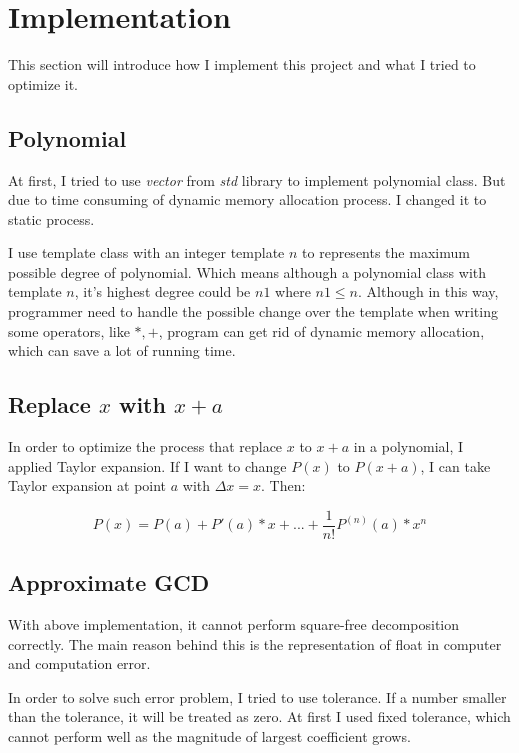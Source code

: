 \section{Implementation}

This section will introduce how I implement this project and what I tried to
optimize it.

\subsection{Polynomial} 

At first, I tried to use \textit{vector} from \textit{std} library to implement
polynomial class. But due to time consuming of dynamic memory allocation
process. I changed it to static process.  

I use template class with an integer template $n$ to represents the
maximum possible degree of polynomial. Which means although a polynomial class with
template $n$, it's highest degree could be $n1$ where $n1 \leq n$. Although in
this way, programmer need to handle the possible change over the template when
writing some operators, like $*,+$, program can get rid of dynamic memory allocation,
which can save a lot of running time.

\subsection{Replace $x$ with $x+a$}

In order to optimize the process that replace $x$ to $x+a$ in a polynomial, I applied Taylor
expansion. If I want to change $P(x)$ to $P(x+a)$, I can take Taylor expansion
at point $a$ with $\Delta x = x$. Then:

$$
P(x) = P(a) + P'(a) *x + ... + \frac{1}{n!}P^{(n)}(a)*x^n
$$


\subsection{Approximate GCD}

With above implementation, it cannot perform square-free decomposition
correctly. The main reason behind this is the representation of float in
computer and computation error. 

In order to solve such error problem, I tried to use tolerance. If a number
smaller than the tolerance, it will be treated as zero. At first I used fixed
tolerance, which cannot perform well as the magnitude of largest coefficient
grows.

